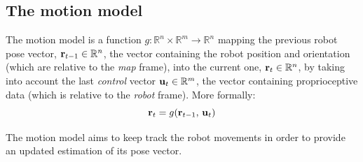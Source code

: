 \subsection{The motion model}
	The motion model is a function $g : \mathbb{R}^n \times \mathbb{R}^m \rightarrow \mathbb{R}^n$ mapping the previous robot pose vector, $\boldsymbol{\mathrm{{r}}}_{t-1} \in \mathbb{R}^n$, \ie{} the vector containing the robot position and orientation (which are relative to the \emph{map} frame), into the current one, $\boldsymbol{\mathrm{{r}}}_t \in \mathbb{R}^n$, by taking into account the last \emph{control} vector $\boldsymbol{\mathrm{{u}}}_t \in \mathbb{R}^m$, \ie{} the vector containing proprioceptive data (which is relative to the \emph{robot} frame). 
	More formally:
	\[
		\boldsymbol{\mathrm{{r}}}_t = g(\boldsymbol{\mathrm{{r}}}_{t-1},\, \boldsymbol{\mathrm{{u}}}_t)
	\]
	
	The motion model aims to keep track the robot movements in order to provide an updated estimation of its pose vector.
	
